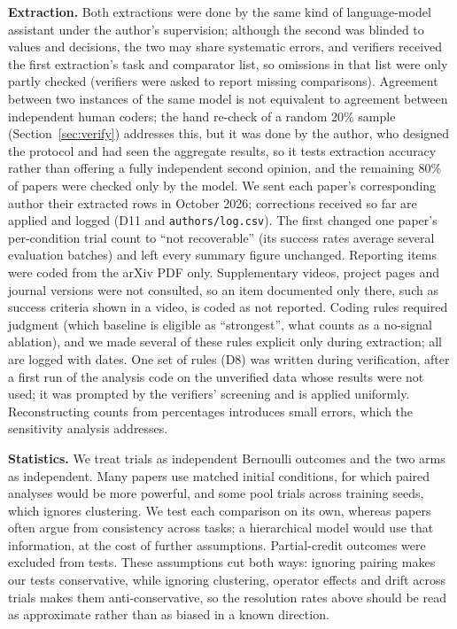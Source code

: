 \documentclass[11pt]{article}
\begin{document}
\textbf{Extraction.} Both extractions were done by the same kind of language-model assistant under the author's supervision; although the second was blinded to values and decisions, the two may share systematic errors, and verifiers received the first extraction's task and comparator list, so omissions in that list were only partly checked (verifiers were asked to report missing comparisons). Agreement between two instances of the same model is not equivalent to agreement between independent human coders; the hand re-check of a random 20\% sample (Section~\ref{sec:verify}) addresses this, but it was done by the author, who designed the protocol and had seen the aggregate results, so it tests extraction accuracy rather than offering a fully independent second opinion, and the remaining 80\% of papers were checked only by the model. We sent each paper's corresponding author their extracted rows in October 2026; corrections received so far are applied and logged (D11 and \texttt{authors/log.csv}). The first changed one paper's per-condition trial count to ``not recoverable'' (its success rates average several evaluation batches) and left every summary figure unchanged. Reporting items were coded from the arXiv PDF only. Supplementary videos, project pages and journal versions were not consulted, so an item documented only there, such as success criteria shown in a video, is coded as not reported. Coding rules required judgment (which baseline is eligible as ``strongest'', what counts as a no-signal ablation), and we made several of these rules explicit only during extraction; all are logged with dates. One set of rules (D8) was written during verification, after a first run of the analysis code on the unverified data whose results were not used; it was prompted by the verifiers' screening and is applied uniformly. Reconstructing counts from percentages introduces small errors, which the sensitivity analysis addresses.

\textbf{Statistics.} We treat trials as independent Bernoulli outcomes and the two arms as independent. Many papers use matched initial conditions, for which paired analyses would be more powerful, and some pool trials across training seeds, which ignores clustering. We test each comparison on its own, whereas papers often argue from consistency across tasks; a hierarchical model would use that information, at the cost of further assumptions. Partial-credit outcomes were excluded from tests. These assumptions cut both ways: ignoring pairing makes our tests conservative, while ignoring clustering, operator effects and drift across trials makes them anti-conservative, so the resolution rates above should be read as approximate rather than as biased in a known direction.
\end{document}
